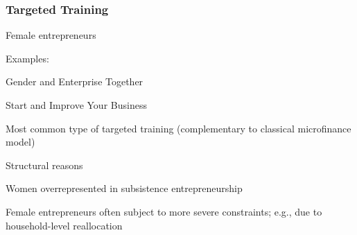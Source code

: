 \documentclass[hideothersubsections, usenames,dvipsnames,11pt]{beamer}
\newenvironment{itemize_2pt}{\itemize\addtolength{\itemsep}{2pt}}{\enditemize}
\begin{document}
\begin{frame}
\frametitle{Targeted Training}
	Female entrepreneurs
	\begin{itemize_2pt}
		\item Examples: 
		\begin{itemize_2pt}
			\item Gender and Enterprise Together \citep[GET Ahead, ILO;][]{Bulte2017, McKenziePuerto2021}
			\item Start and Improve Your Business \citep[SIYB, IFC;][]{deMel2014}
		\end{itemize_2pt}
		\item \textcolor{bdf}{Most common type of targeted training} (complementary to classical microfinance model)
		
		\vspace{0.5em}
		
		\item Structural reasons
		\begin{itemize_2pt}
			\item Women overrepresented in subsistence entrepreneurship
			\item Female entrepreneurs often subject to more severe constraints; e.g., due to household-level reallocation \citep[see, e.g.,][]{Bernhardt2019, deMel2009a}
		\end{itemize_2pt}
	\end{itemize_2pt}
\end{frame}
\end{document}
